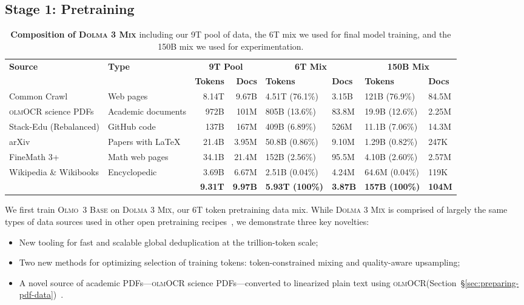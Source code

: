 \documentclass[table]{ai2style/ai2}
\newcommand{\newOlmo}{Olmo\xspace}
\newcommand{\olmothreebase}{\textsc{\newOlmo~3 Base}\xspace}
\newcommand{\dolmatoomix}{\textsc{Dolma 3 Mix}\xspace}
\newcommand{\olmocr}{\textsc{olmOCR}\xspace}
\newcommand{\olmocrPDF}{{\olmocr science PDFs}\xspace}
\begin{document}
\subsection{Stage 1: Pretraining}\label{sec:pretraining}

\begin{table}[h]
\centering
\footnotesize
\renewcommand{\arraystretch}{1}
\begin{tabular}{l l rr ll ll}
\toprule
{\bf Source} & 
{\bf Type} & 
\multicolumn{2}{c}{{\bf 9T Pool}} & 
\multicolumn{2}{c}{{\bf 6T Mix}} & 
\multicolumn{2}{c}{{\bf 150B Mix}} \\
\cmidrule(lr){3-4} \cmidrule(lr){5-6} \cmidrule(lr){7-8}
& & {\bf Tokens} & {\bf Docs} & {\bf Tokens} & {\bf Docs} & {\bf Tokens} & {\bf Docs} \\
\midrule
\rowcolor{ai2offwhite}Common Crawl & Web pages & 8.14T & 9.67B & 4.51T (76.1\%) & 3.15B & 121B (76.9\%) & 84.5M \\ 
\olmocrPDF & Academic documents & 972B & 101M & 805B (13.6\%) & 83.8M & 19.9B (12.6\%) & 2.25M \\
\rowcolor{ai2offwhite} Stack-Edu (Rebalanced) & GitHub code & 137B & 167M & 409B (6.89\%) & 526M & 11.1B (7.06\%) & 14.3M \\
arXiv & Papers with LaTeX & 21.4B & 3.95M & 50.8B (0.86\%) & 9.10M & 1.29B (0.82\%) & 247K \\
\rowcolor{ai2offwhite}FineMath 3+ & Math web pages & 34.1B & 21.4M & 152B (2.56\%) & 95.5M & 4.10B (2.60\%) & 2.57M \\
Wikipedia \& Wikibooks & Encyclopedic & 3.69B & 6.67M & 2.51B (0.04\%) & 4.24M & 64.6M (0.04\%) & 119K \\
\rowcolor{ai2offwhite}{\bf Total} & & {\bf 9.31T} & {\bf 9.97B} & {\bf 5.93T (100\%)} & {\bf 3.87B} & {\bf 157B (100\%)} & {\bf 104M} \\
\bottomrule
\end{tabular}
\caption{
\textbf{Composition of \dolmatoomix} including our 9T pool of data, the 6T mix we used for final model training, and the 150B mix we used for experimentation. 
}
\label{table:data-stage-1}
\end{table}

We first train \olmothreebase on {\dolmatoomix}, our 6T token pretraining data mix.
While \dolmatoomix is comprised of largely the same types of data sources used in other open pretraining recipes~\citep{soldaini2024dolma,bakouch2025smollm3,olmo20242olmo2furious}, we demonstrate three key novelties:
\begin{itemize}[topsep=0pt,parsep=0pt]
    \item New tooling for fast and scalable global deduplication at the trillion-token scale;
    \item Two new methods for optimizing selection of training tokens: token-constrained mixing and quality-aware upsampling;
    \item A novel source of academic PDFs---\olmocrPDF---converted to linearized plain text using \olmocr(Section~\S\ref{sec:preparing-pdf-data})~\citep{poznanski2025olmocr}.
\end{itemize}
\end{document}
